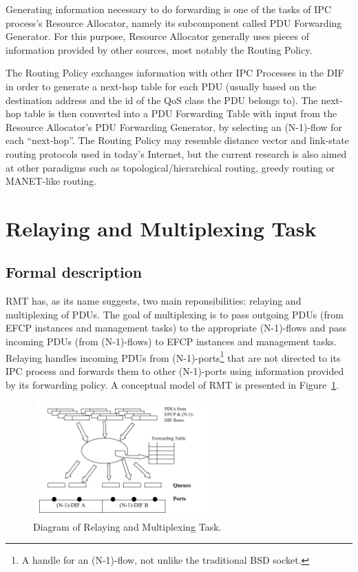         Generating information necessary to do forwarding is one of the tasks of IPC process's Resource Allocator, namely its subcomponent called PDU Forwarding Generator. For this purpose, Resource Allocator generally uses pieces of information provided by other sources, most notably the Routing Policy.

        The Routing Policy exchanges information with other IPC Processes in the DIF in order to generate a next-hop table for each PDU (usually based on the destination address and the id of the QoS class the PDU belongs to). The next-hop table is then converted into a PDU Forwarding Table with input from the Resource Allocator's PDU Forwarding Generator, by selecting an (N-1)-flow for each ``next-hop''. The Routing Policy may resemble distance vector and link-state routing protocols used in today's Internet, but the current research is also aimed at other paradigms such as topological/hierarchical routing, greedy routing or MANET-like routing.


    \section{Relaying and Multiplexing Task}

        \subsection{Formal description}

            RMT has, as its name suggests, two main reponsibilities: relaying and multiplexing of PDUs. The goal of multiplexing is to pass outgoing PDUs (from EFCP instances and management tasks) to the appropriate (N-1)-flows and pass incoming PDUs (from (N-1)-flows) to EFCP instances and management tasks. Relaying handles incoming PDUs from (N-1)-ports\footnote{A handle for an (N-1)-flow, not unlike the traditional BSD socket.} that are not directed to its IPC process and forwards them to other (N-1)-ports using information provided by its forwarding policy. A conceptual model of RMT is presented in Figure~\ref{fig:rina:rmt:model}.

            \begin{figure}[H]
                \begin{center}
                    \includegraphics[width=0.6\textwidth]{fig/fwding_rmt-module.png}
                  \caption{Diagram of Relaying and Multiplexing Task.}
                  \label{fig:rina:rmt:model}
                \end{center}
            \end{figure}

